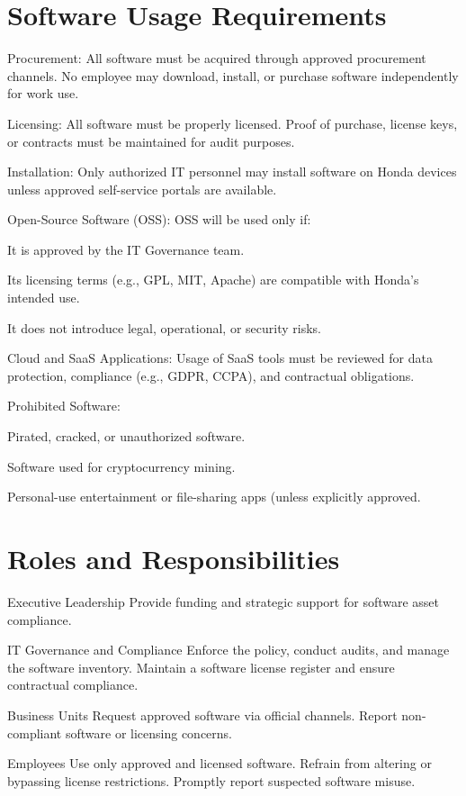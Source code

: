 \section{Software Usage Requirements}

Procurement: All software must be acquired through approved procurement channels. No employee may download, install, or purchase software independently for work use.

Licensing: All software must be properly licensed. Proof of purchase, license keys, or contracts must be maintained for audit purposes.

Installation: Only authorized IT personnel may install software on Honda devices unless approved self-service portals are available.

Open-Source Software (OSS): OSS will be used only if:

    It is approved by the IT Governance team.

    Its licensing terms (e.g., GPL, MIT, Apache) are compatible with Honda’s intended use.

    It does not introduce legal, operational, or security risks.

Cloud and SaaS Applications: Usage of SaaS tools must be reviewed for data protection, compliance (e.g., GDPR, CCPA), and contractual obligations.

Prohibited Software:

Pirated, cracked, or unauthorized software.

Software used for cryptocurrency mining.

Personal-use entertainment or file-sharing apps (unless explicitly approved.

\section{Roles and Responsibilities}

Executive Leadership
    Provide funding and strategic support for software asset compliance.

IT Governance and Compliance
    Enforce the policy, conduct audits, and manage the software inventory.
    Maintain a software license register and ensure contractual compliance.

Business Units
    Request approved software via official channels.
    Report non-compliant software or licensing concerns.

Employees
    Use only approved and licensed software.
    Refrain from altering or bypassing license restrictions.
    Promptly report suspected software misuse.


